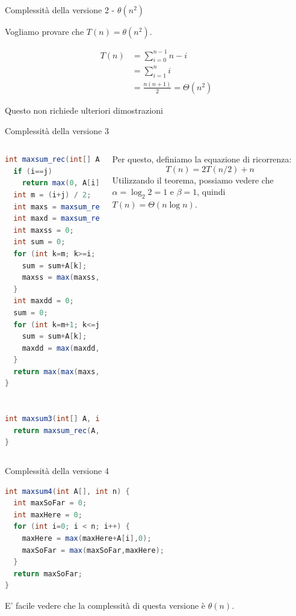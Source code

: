 \begin{frame}{Complessità della versione 2 - $\theta(n^2)$}

Vogliamo provare che $T(n) = \theta(n^2)$.

\begin{align*}
T(n) &= \sum_{i=0}^{n-1} n-i \\
     &= \sum_{i=1}^{n} i \\
     &= \frac{n(n+1)}{2} = \Theta(n^2)
\end{align*}

Questo non richiede ulteriori dimostrazioni

\end{frame}

\begin{frame}[fragile]{Complessità della versione 3}

\footnotesize
\vspace{-6pt}
\begin{columns}[T]
\vspace{-12pt}
\begin{lstlisting}[language=java]
int maxsum_rec(int[] A, int i, int j) {
  if (i==j) 
    return max(0, A[i]);
  int m = (i+j) / 2;
  int maxs = maxsum_rec(A, i, m);
  int maxd = maxsum_rec(A, m+1, j);
  int maxss = 0;
  int sum = 0;
  for (int k=m; k>=i; k--) {
    sum = sum+A[k];
    maxss = max(maxss, sum);
  }
  int maxdd = 0;
  sum = 0;
  for (int k=m+1; k<=j; k++) {
    sum = sum+A[k];
    maxdd = max(maxdd, sum);
  }
  return max(max(maxs,maxd),maxss+maxdd);
}


int maxsum3(int[] A, int n) {
  return maxsum_rec(A,0,n-1);
}
\end{lstlisting}  
Per questo, definiamo la equazione di ricorrenza: \pause
\[
  T(n) = 2T(n/2) + n
\]
Utilizzando il teorema, possiamo vedere che $\alpha = \log_2 2 = 1$ e $\beta=1$, quindi $T(n) = \Theta(n \log n)$.
\end{columns}

\end{frame}


\begin{frame}[fragile]{Complessità della versione 4}

\vspace{-18pt}
\begin{lstlisting}[language=java]
int maxsum4(int A[], int n) {
  int maxSoFar = 0;
  int maxHere = 0;
  for (int i=0; i < n; i++) {
    maxHere = max(maxHere+A[i],0);
    maxSoFar = max(maxSoFar,maxHere);
  }  
  return maxSoFar;
}
\end{lstlisting}  

E' facile vedere che la complessità di questa versione è $\theta(n)$.

\end{frame}

